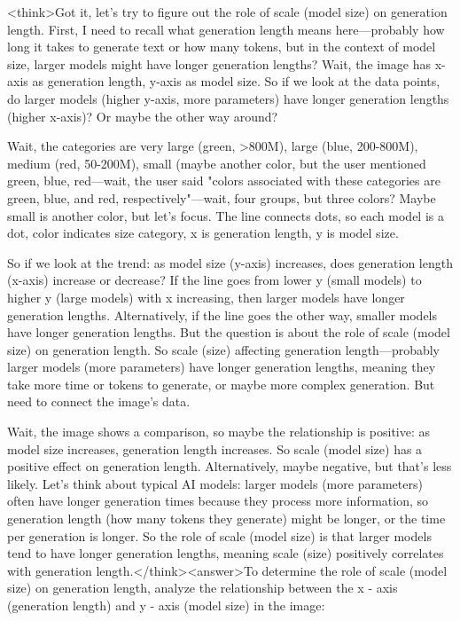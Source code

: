 <think>Got it, let's try to figure out the role of scale (model size) on generation length. First, I need to recall what generation length means here—probably how long it takes to generate text or how many tokens, but in the context of model size, larger models might have longer generation lengths? Wait, the image has x-axis as generation length, y-axis as model size. So if we look at the data points, do larger models (higher y-axis, more parameters) have longer generation lengths (higher x-axis)? Or maybe the other way around?

Wait, the categories are very large (green, >800M), large (blue, 200-800M), medium (red, 50-200M), small (maybe another color, but the user mentioned green, blue, red—wait, the user said "colors associated with these categories are green, blue, and red, respectively"—wait, four groups, but three colors? Maybe small is another color, but let's focus. The line connects dots, so each model is a dot, color indicates size category, x is generation length, y is model size.

So if we look at the trend: as model size (y-axis) increases, does generation length (x-axis) increase or decrease? If the line goes from lower y (small models) to higher y (large models) with x increasing, then larger models have longer generation lengths. Alternatively, if the line goes the other way, smaller models have longer generation lengths. But the question is about the role of scale (model size) on generation length. So scale (size) affecting generation length—probably larger models (more parameters) have longer generation lengths, meaning they take more time or tokens to generate, or maybe more complex generation. But need to connect the image's data.

Wait, the image shows a comparison, so maybe the relationship is positive: as model size increases, generation length increases. So scale (model size) has a positive effect on generation length. Alternatively, maybe negative, but that's less likely. Let's think about typical AI models: larger models (more parameters) often have longer generation times because they process more information, so generation length (how many tokens they generate) might be longer, or the time per generation is longer. So the role of scale (model size) is that larger models tend to have longer generation lengths, meaning scale (size) positively correlates with generation length.</think><answer>To determine the role of scale (model size) on generation length, analyze the relationship between the x - axis (generation length) and y - axis (model size) in the image:  

